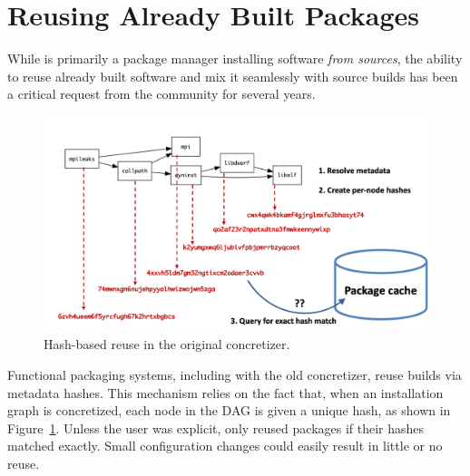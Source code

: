 \section{Reusing Already Built Packages}
\label{sec:reuse}

While \spack{} is primarily a package manager installing software \emph{from sources},
the ability to reuse already built software and mix it seamlessly with source builds has
been a critical request from the community for several years.

\begin{figure}[t]
  \centering
  \includegraphics[width=\columnwidth]{figures/hash-cache.pdf}
  \caption{
    Hash-based reuse in the original \spack concretizer.
    \label{fig:hash_reuse}
  }
\end{figure}

Functional packaging systems, including \spack{} with the old concretizer, reuse builds
via metadata hashes. This mechanism relies on the fact that, when an installation graph
is concretized, each node in the DAG is given a unique hash, as shown in
Figure~\ref{fig:hash_reuse}.
Unless the user was explicit, \spack{} only reused packages if their hashes matched
exactly. Small configuration changes could easily result in little or no reuse.


